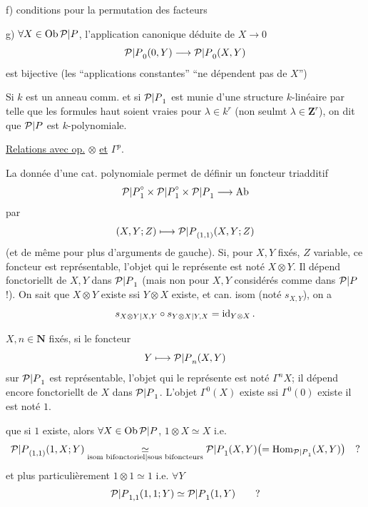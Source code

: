 f) conditions  pour la permutation des facteurs

g) $\forall X\in\operatorname{Ob}{\mathcal P|P}$, l'application canonique déduite de $X\longrightarrow0$
\[
{\mathcal P|P}_0(0,Y)\longrightarrow {\mathcal P|P}_0(X,Y)
\]
est bijective (les ``applications constantes''  ``ne dépendent pas de $X$'')

Si $k$ est un anneau comm. et si ${\mathcal P|P}_1$ est munie d'une structure $k$-linéaire par
 telle que les formules haut soient vraies pour $\lambda\in k^r$ (non seulmt $\lambda\in\mathbf Z^r$), on dit que ${\mathcal P|P}$ est $k$-polynomiale.

\uline{Relations avec op.} $\otimes$ \uline{et} $\Gamma^p$.

La donnée d'une cat. polynomiale  permet de définir un foncteur triadditif
\[
{\mathcal P|P}_1^\circ\times {\mathcal P|P}_1^\circ\times {\mathcal P|P}_1\longrightarrow\operatorname{Ab}
\]
par
\[
(X,Y;Z)\longmapsto {\mathcal P|P}_{(1,1)}(X,Y;Z)
\]
(et de même pour plus d'arguments de gauche).
Si, pour $X,Y$ fixés, $Z$ variable, ce foncteur est représentable, l'objet qui le représente est noté $X\otimes Y$. Il dépend fonctoriellt de $X,Y$ dans ${\mathcal P|P}_1$ (mais non pour $X,Y$  considérés comme dans ${\mathcal P|P}$ !).  On sait que $X\otimes Y$ existe ssi $Y\otimes X$ existe, et  can. isom (noté $s_{X,Y}$), on a
\[
s_{{X\otimes Y|X,Y}}\circ s_{{Y\otimes X|Y,X}}=\operatorname{id}_{Y\otimes X}.
\]

 $X,n\in\mathbf N$ fixés, si le foncteur
\[
Y\longmapsto {\mathcal P|P}_n(X,Y)
\]
sur ${\mathcal P|P}_1$ est représentable, l'objet qui le représente est noté $\Gamma^n X$; il dépend encore fonctoriellt de $X$ dans ${\mathcal P|P}_1$. L'objet $\Gamma^0(X)$ existe ssi $\Gamma^0(0)$ existe il est noté $1$.

 que \deleted{\unsure{$\forall$}} si $1$ existe, alors $\forall X\in\operatorname{Ob}{\mathcal P|P}$, $1\otimes X\simeq X$ i.e.
\[
{\mathcal P|P}_{(1,1)}(1,X;Y)\mathrel{\mathop{\simeq}\limits_{{\text{isom bifonctoriel}|\text{sous bifoncteurs}}}}{\mathcal P|P}_1(X,Y)\bigl(=\operatorname{Hom}_{{\mathcal P|P}_1}(X,Y)\bigr)\quad ?
\]
et plus particulièrement $1\otimes1\simeq1$ i.e. $\forall Y$
\[
{\mathcal P|P}_{1,1}(1,1;Y)\simeq {\mathcal P|P}_1(1,Y)\qquad ?
\]

